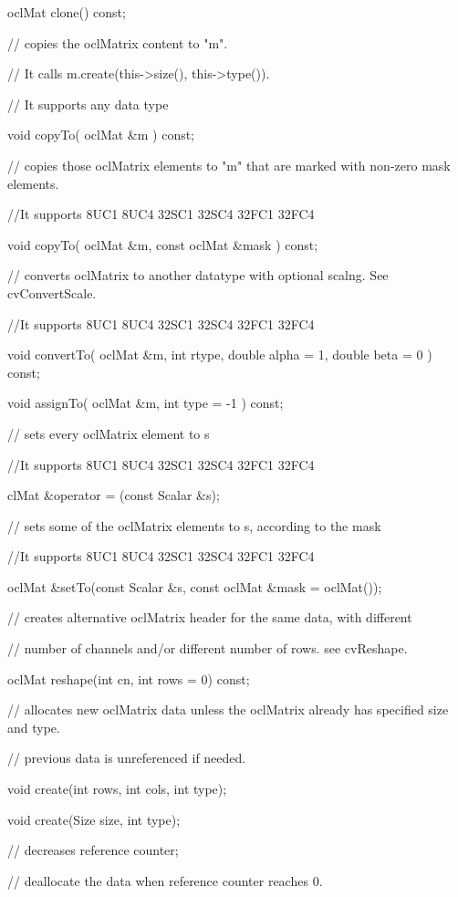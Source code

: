 \documentclass{article}
\begin{document}
     oclMat clone() const;


      // copies the oclMatrix content to "m".

     // It calls m.create(this-\textgreater size(), this-\textgreater type()).

     // It supports any data type

     void copyTo( oclMat \&m ) const;

     // copies those oclMatrix elements to "m" that are marked with non-zero mask elements.

     //It supports 8UC1 8UC4 32SC1 32SC4 32FC1 32FC4

     void copyTo( oclMat \&m, const oclMat \&mask ) const;

     // converts oclMatrix to another datatype with optional scalng. See cvConvertScale.

     //It supports 8UC1 8UC4 32SC1 32SC4 32FC1 32FC4

     void convertTo( oclMat \&m, int rtype, double alpha = 1, double beta = 0 ) const;


     void assignTo( oclMat \&m, int type = -1 ) const;


     // sets every oclMatrix element to s

     //It supports 8UC1 8UC4 32SC1 32SC4 32FC1 32FC4

     clMat \&operator = (const Scalar \&s);

     // sets some of the oclMatrix elements to s, according to the mask

     //It supports 8UC1 8UC4 32SC1 32SC4 32FC1 32FC4

     oclMat \&setTo(const Scalar \&s, const oclMat \&mask = oclMat());

     // creates alternative oclMatrix header for the same data, with different

     // number of channels and/or different number of rows. see cvReshape.

     oclMat reshape(int cn, int rows = 0) const;


     // allocates new oclMatrix data unless the oclMatrix already has specified size and type.

     // previous data is unreferenced if needed.

     void create(int rows, int cols, int type);

     void create(Size size, int type);

     // decreases reference counter;

     // deallocate the data when reference counter reaches 0.
\end{document}
